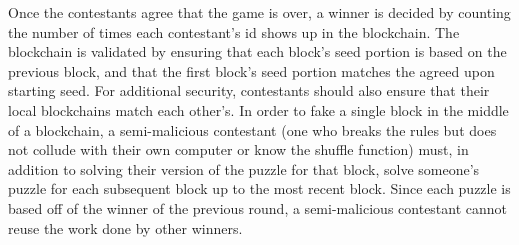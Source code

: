 \documentclass[leqno,12pt]{article}
\begin{document}
Once the contestants agree that the game is over, a winner is decided by counting the number of times each contestant's id shows up in the blockchain. The blockchain is validated by ensuring that each block's seed portion is based on the previous block, and that the first block's seed portion matches the agreed upon starting seed. For additional security, contestants should also ensure that their local blockchains match each other's. In order to fake a single block in the middle of a blockchain, a semi-malicious contestant (one who breaks the rules but does not collude with their own computer or know the shuffle function) must, in addition to solving their version of the puzzle for that block, solve someone's puzzle for each subsequent block up to the most recent block. Since each puzzle is based off of the winner of the previous round, a semi-malicious contestant cannot reuse the work done by other winners.
\end{document}
